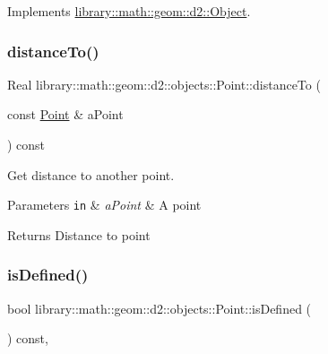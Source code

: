 Implements \hyperlink{classlibrary_1_1math_1_1geom_1_1d2_1_1_object_a5c26ae4120edb24f6463d65a9cef247d}{library\+::math\+::geom\+::d2\+::\+Object}.

\mbox{\label{classlibrary_1_1math_1_1geom_1_1d2_1_1objects_1_1_point_a1615c904b4f5a1c406cdba97df6445d8}} 
\subsubsection{\texorpdfstring{distance\+To()}{distanceTo()}}
{\footnotesize\ttfamily Real library\+::math\+::geom\+::d2\+::objects\+::\+Point\+::distance\+To (\begin{DoxyParamCaption}\item[{const \hyperlink{classlibrary_1_1math_1_1geom_1_1d2_1_1objects_1_1_point}{Point} \&}]{a\+Point }\end{DoxyParamCaption}) const}



Get distance to another point. 


\begin{DoxyParams}[1]{Parameters}
\mbox{\tt in}  & {\em a\+Point} & A point \\
\hline
\end{DoxyParams}
\begin{DoxyReturn}{Returns}
Distance to point 
\end{DoxyReturn}
\mbox{\label{classlibrary_1_1math_1_1geom_1_1d2_1_1objects_1_1_point_ac90251968d8eb11df82e28f6cf095e5c}} 
\subsubsection{\texorpdfstring{is\+Defined()}{isDefined()}}
{\footnotesize\ttfamily bool library\+::math\+::geom\+::d2\+::objects\+::\+Point\+::is\+Defined (\begin{DoxyParamCaption}{ }\end{DoxyParamCaption}) const\hspace{0.3cm}{\ttfamily [override]}, {\ttfamily [virtual]}}



